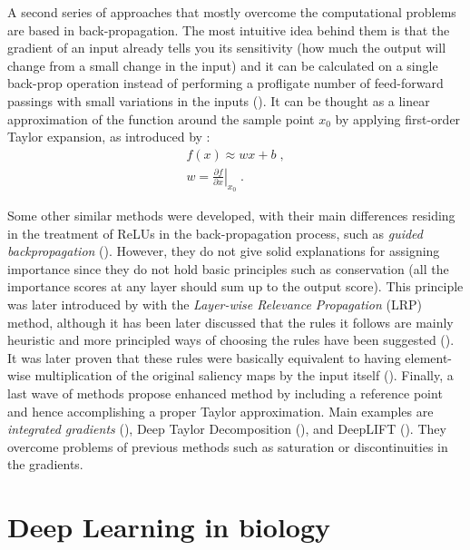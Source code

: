 	A second series of approaches that mostly overcome the computational problems are based in back-propagation. The most intuitive idea behind them is that the gradient of an input already tells you its sensitivity (how much the output will change from a small change in the input) and it can be calculated on a single back-prop operation instead of performing a profligate number of feed-forward passings with small variations in the inputs (\cite{Shrikumar2017}). It can be thought as a linear approximation of the function around the sample point $x_0$ by applying first-order Taylor expansion, as introduced by \cite{Simonyan2014}:
	\begin{align}
	f(x) \approx w x + b \; , \nonumber \\
	w = \left. \frac{\partial f}{\partial x} \right|_{x_0} \; .
	\end{align}
		
	Some other similar methods were developed, with their main differences residing in the treatment of ReLUs in the back-propagation process, such as \textit{guided backpropagation} (\cite{Springenberg2014}). However, they do not give solid explanations for assigning importance since they do not hold basic principles such as conservation (all the importance scores at any layer should sum up to the output score). This principle was later introduced by \cite{Bach2015} with the \textit{Layer-wise Relevance Propagation} (LRP) method, although it has been later discussed that the rules it follows are mainly heuristic and more principled ways of choosing the rules have been suggested (\cite{Montavon2017}). It was later proven that these rules were basically equivalent to having element-wise multiplication of the original saliency maps by the input itself (\cite{Shrikumar2016}). Finally, a last wave of methods propose enhanced method by including a reference point and hence accomplishing a proper Taylor approximation. Main examples are \textit{integrated gradients} (\cite{Sundararajan2017}), Deep Taylor Decomposition (\cite{Montavon2017}), and DeepLIFT (\cite{Shrikumar2017}). They overcome problems of previous methods such as saturation or discontinuities in the gradients.

\section{Deep Learning in biology}

